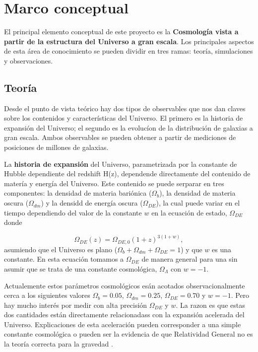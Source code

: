 
\section{Marco conceptual}


El principal elemento conceptual de este proyecto es la {\bf Cosmolog\'ia
vista a partir de la estructura del Universo a gran escala}. 
Los principales aspectos de esta área de conocimiento se pueden
dividir en tres ramas: teoría, simulaciones y observaciones.


\subsection{Teor\'ia}

Desde el punto de vista te\'orico hay dos tipos de observables que nos
dan claves sobre los contenidos y características del Universo.
El primero es la historia de expansi\'on del Universo; el segundo es
la evolucíon de la distribución de galaxias a gran escala.
Ambos observables se pueden obtener a partir de mediciones de
posiciones de millones de galaxias.

La {\bf historia de expansi\'on} del Universo, parametrizada por la
constante de Hubble dependiente del redshift H(z), dependende
directamente del contenido de mater\'ia y energ\'ia del Universo. 
Este contenido se puede serparar en tres componentes: la densidad de materia
bari\'onica ($\Omega_b$), la densidad de materia oscura
($\Omega_{dm}$) y la densidd de energ\'ia  oscura  ($\Omega_{DE}$), la
cual puede variar en el tiempo dependiendo del valor de la constante
$w$ en la ecuaci\'on de estado, $\Omega_{DE}$ donde 

\begin{equation}
\Omega_{DE}(z) = \Omega_{DE,0}(1+z)^{3(1+w)},
\end{equation}
%
asumiendo que el Universo es plano
($\Omega_b+\Omega_{dm}+\Omega_{DE}=1$) y que $w$ es una constante. 
En esta ecuaci\'on tomamos a $\Omega_{DE}$ de manera general para una
sin asumir que se trata de una constante cosmol\'ogica,
$\Omega_\Lambda$ con $w=-1$.   

Actualemente estos par\'ametros cosmol\'ogicos es\'an
acotados observacionalmente cerca a los siguientes valores $\Omega_b=0.05$,
$\Omega_{dm}=0.25$, $\Omega_{DE}=0.70$ y $w=-1$. 
Pero hay mucho interés por medir con alta precisión
$\Omega_{DE}$ y $w$.
La razon es que estas dos cantidades est\'an directamente 
relacionadass con  la expansi\'on acelerada del Universo.
Explicaciones de esta aceleración pueden corresponder a una simple
constante cosmol\'ogica o pueden ser la evidencia de que Relatividad
General no es la teor\'ia correcta para la gravedad 
\cite{2014arXiv1401.0046M}.

